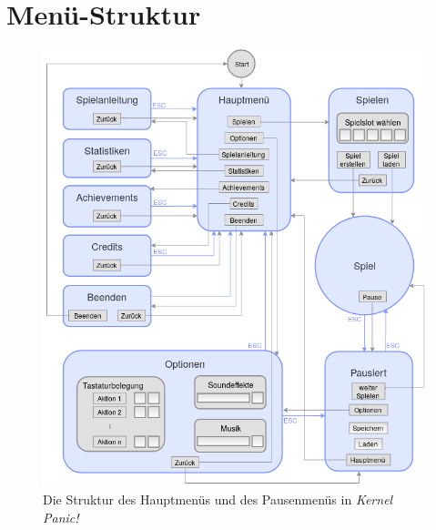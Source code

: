 \section{Menü-Struktur}\label{sec:menu}


%
%

\begin{figure}[ht]
	\centering
	\includegraphics[width=1\textwidth]{menu_structure.png}
  \caption{Die Struktur des Hauptmenüs und des Pausenmenüs in \emph{Kernel Panic!}}
	\label{fig:menu}
\end{figure}

